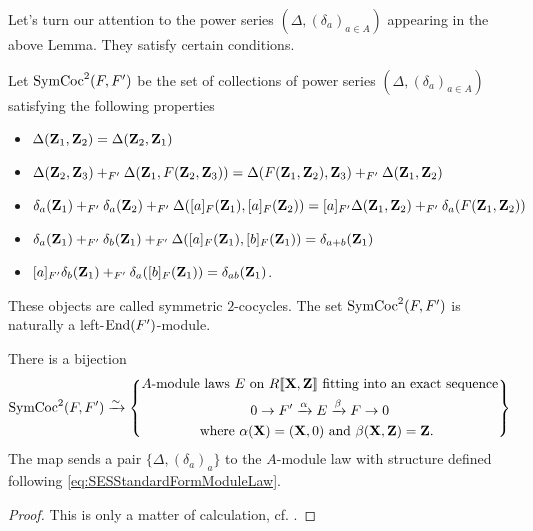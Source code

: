 \documentclass[../main.tex]{subfiles}
\begin{document}
Let's turn our attention to the power series $(\Delta, (\delta_a)_{a\in A})$
appearing in the above Lemma. They satisfy certain conditions.
\begin{defi}\label{def:SymCoc2}
  Let $\operatorname{SymCoc}^2(F, F')$ be the set of collections of power series $(\Delta,
  (\delta_a)_{a \in A})$ satisfying the following properties
  \begin{itemize}
    \item $\Delta(\mathbf{Z}_1,\mathbf{Z}_2) = \Delta(\mathbf{Z}_2,\mathbf{Z}_1)$
    \item $\Delta(\mathbf{Z}_2,\mathbf{Z}_3) +_{F'} \Delta(\mathbf{Z}_1, F(\mathbf{Z}_2,\mathbf{Z}_3)) = \Delta(F(\mathbf{Z}_1,\mathbf{Z}_2), \mathbf{Z}_3) +_{F'} \Delta(\mathbf{Z}_1,\mathbf{Z}_2)$
    \item $\delta_a(\mathbf{Z}_1) +_{F'} \delta_a(\mathbf{Z}_2) +_{F'} \Delta([a]_F(\mathbf{Z}_1), [a]_F(\mathbf{Z}_2)) = 
      [a]_{F'}\Delta(\mathbf{Z}_1,\mathbf{Z}_2) +_{F'} \delta_a(F(\mathbf{Z}_1,\mathbf{Z}_2))$
    \item $\delta_a(\mathbf{Z}_1) +_{F'} \delta_b(\mathbf{Z}_1) +_{F'} \Delta([a]_F(\mathbf{Z}_1), [b]_F(\mathbf{Z}_1)) =
      \delta_{a+b}(\mathbf{Z}_1)$
    \item $[a]_{F'}\delta_b(\mathbf{Z}_1) +_{F'} \delta_a([b]_F(\mathbf{Z}_1)) = \delta_{ab}(\mathbf{Z}_1)$.
  \end{itemize}
  These objects are called symmetric $2$-cocycles. The set $\operatorname{SymCoc}^2(F, F')$
  is naturally a left-$\operatorname{End}(F')$-module.
\end{defi}
\begin{prop}\label{prop:ClassOfFGLitoSymCoc}
  There is a bijection 
  \begin{equation*}
    \operatorname{SymCoc}^2(F, F') \xrightarrow{\sim} \left\{
      \begin{gathered}
        \text{$A$-module laws $E$ on $R\llbracket \mathbf{X}, \mathbf{Z} \rrbracket$ fitting into an
        exact sequence}
        \\ 0 \to F' \xrightarrow{\alpha} E \xrightarrow{\beta} F \to 0 \\
        \text{where $\alpha(\mathbf{X}) = (\mathbf{X}, 0)$ and $\beta(\mathbf{X}, \mathbf{Z}) = \mathbf{Z}$. }
      \end{gathered}
      \right\}
  \end{equation*}
  The map sends a pair $\{\Delta, (\delta_a)_a\}$ to the $A$-module law with
  structure defined following \eqref{eq:SESStandardFormModuleLaw}. 
  \begin{proof}[Proof]
    This is only a matter of calculation, cf. \cite[Section
    6]{hopkins1994equivariant}.
  \end{proof}
\end{prop}
\end{document}
